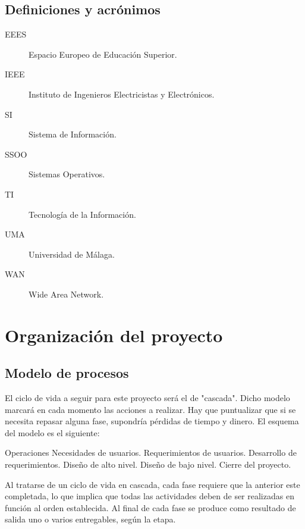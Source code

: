 \documentclass[11pt,a4paper,spanish,twoside]{report}
\begin{document}
\section{Definiciones y acrónimos}
\begin{description}
\item[EEES] Espacio Europeo de Educación Superior.
\item[IEEE] Instituto de Ingenieros Electricistas y Electrónicos.
\item[SI] Sistema de Información.
\item[SSOO] Sistemas Operativos.
\item[TI] Tecnología de la Información.
\item[UMA] Universidad de Málaga.
\item[WAN] Wide Area Network.
\end{description}

\chapter{Organización del proyecto}
\section{Modelo de procesos}
El ciclo de vida a seguir para este proyecto será el de "cascada". Dicho 
modelo marcará en cada momento las acciones a realizar. Hay que puntualizar 
que si se necesita repasar alguna fase, supondría pérdidas de tiempo y dinero.
El esquema del modelo es el siguiente:

Operaciones
      Necesidades de usuarios.
            Requerimientos de usuarios.
                   Desarrollo de requerimientos.
                         Diseño de alto nivel.
                               Diseño de bajo nivel.
                                     Cierre del proyecto.

Al tratarse de un ciclo de vida en cascada, cada fase requiere que la anterior 
este completada, lo que implica que todas las actividades deben de ser 
realizadas en función al orden establecida. Al final de cada fase se produce 
como resultado de salida uno o varios entregables, según la etapa.
\end{document}

